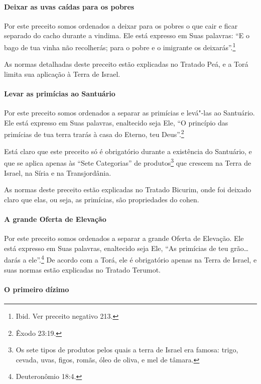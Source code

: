 \begin{multicols}{2}
\paragraph{Deixar as uvas caídas para os pobres}

Por este preceito somos ordenados a deixar para os pobres o que cair e
ficar separado do cacho durante a vindima. Ele está expresso em Suas
palavras: ``E o bago de tua vinha não recolherás; para o pobre e o
imigrante os deixarás''.\footnote{Ibid. Ver preceito negativo 213.}

As normas detalhadas deste preceito estão explicadas no Tratado Peá\starr, e a
Torá\starr{} limita sua aplicação à Terra de Israel.

\paragraph{Levar as primícias ao Santuário}

Por este preceito somos ordenados a separar as primícias e levá"-las ao
Santuário. Ele está expresso em Suas palavras, enaltecido seja Ele, ``O
princípio das primícias de tua terra trarás à casa do Eterno, teu
Deus''.\footnote{Êxodo 23:19.}

Está claro que este preceito só é obrigatório durante a existência do
Santuário, e que se aplica apenas às ``Sete Categorias'' de
produtos\footnote{Os sete tipos de produtos pelos quais a terra de Israel era famosa:
  trigo, cevada, uvas, figos, romãs, óleo de oliva, e mel de tâmara.} que crescem na Terra de Israel, na Síria
e na Transjordânia.

As normas deste preceito estão explicadas no Tratado Bicurim\starr, onde foi deixado claro que elas, ou seja, as primícias, são propriedades do cohen\starr.

\paragraph{A grande Oferta de Elevação}

Por este preceito somos ordenados a separar a grande Oferta de
Elevação. Ele está expresso em Suas palavras, enaltecido seja Ele, ``As
primícias de teu grão\ldots{} darás a ele''.\footnote{Deuteronômio 18:4.} De acordo
com a Torá\starr, ele é obrigatório apenas na Terra de Israel, e suas normas
estão explicadas no Tratado Terumot\starr.

\paragraph{O primeiro dízimo}


\end{multicols}
